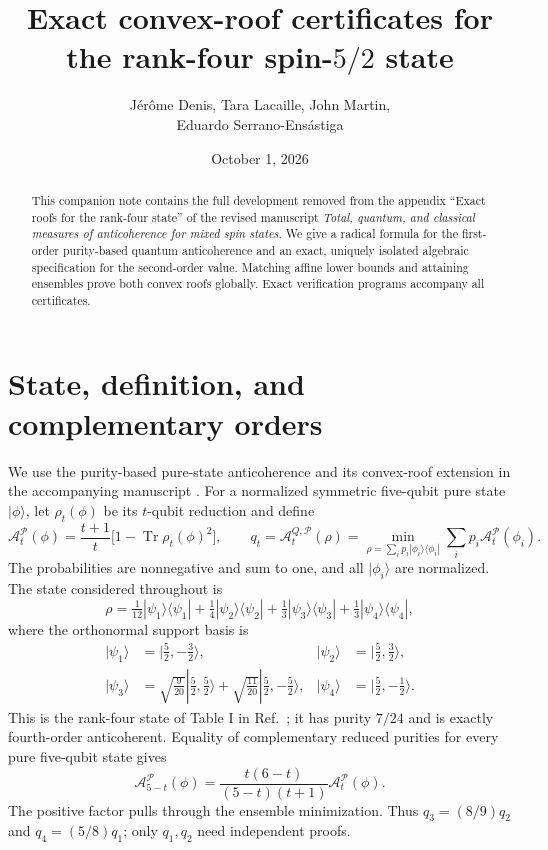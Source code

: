 \documentclass[11pt]{article}
\title{Exact convex-roof certificates for the rank-four spin-$5/2$ state}
\author{J\'er\^ome Denis, Tara Lacaille, John Martin,\\Eduardo Serrano-Ens\'astiga}
\date{October 1, 2026}
\DeclareMathOperator{\Tr}{Tr}
\newcommand{\A}{\mathcal A}
\begin{document}
\maketitle
\begin{abstract}
This companion note contains the full development removed from the appendix ``Exact roofs for the rank-four state'' of the revised manuscript \emph{Total, quantum, and classical measures of anticoherence for mixed spin states}. We give a radical formula for the first-order purity-based quantum anticoherence and an exact, uniquely isolated algebraic specification for the second-order value. Matching affine lower bounds and attaining ensembles prove both convex roofs globally. Exact verification programs accompany all certificates.
\end{abstract}

\section{State, definition, and complementary orders}\label{sec:definition}
We use the purity-based pure-state anticoherence \cite{BaguetteMartin2017} and its convex-roof extension in the accompanying manuscript \cite{Denis2026}. For a normalized symmetric five-qubit pure state $|\phi\rangle$, let $\rho_t(\phi)$ be its $t$-qubit reduction and define
\begin{equation}
 \A_t^{\mathcal P}(\phi)=\frac{t+1}{t}\bigl[1-\Tr\rho_t(\phi)^2\bigr],\qquad
 q_t=\A_t^{Q,\mathcal P}(\rho)=\min_{\rho=\sum_i p_i|\phi_i\rangle\langle\phi_i|}\sum_i p_i\A_t^{\mathcal P}(\phi_i).
\end{equation}
The probabilities are nonnegative and sum to one, and all $|\phi_i\rangle$ are normalized. The state considered throughout is
\begin{equation}\label{eq:j5o2_4AC}
 \rho=\tfrac1{12}|\psi_1\rangle\langle\psi_1|+\tfrac14|\psi_2\rangle\langle\psi_2|
 +\tfrac13|\psi_3\rangle\langle\psi_3|+\tfrac13|\psi_4\rangle\langle\psi_4|,
\end{equation}
where the orthonormal support basis is
\begin{align}
 |\psi_1\rangle&=|\tfrac52,-\tfrac32\rangle,&
 |\psi_2\rangle&=|\tfrac52,\tfrac32\rangle,\nonumber\\
 |\psi_3\rangle&=\sqrt{\tfrac9{20}}|\tfrac52,\tfrac52\rangle+\sqrt{\tfrac{11}{20}}|\tfrac52,-\tfrac52\rangle,&
 |\psi_4\rangle&=|\tfrac52,-\tfrac12\rangle.
\end{align}
This is the rank-four state of Table I in Ref.~\cite{Denis2026}; it has purity $7/24$ and is exactly fourth-order anticoherent. Equality of complementary reduced purities for every pure five-qubit state gives
\begin{equation}
 \A_{5-t}^{\mathcal P}(\phi)=\frac{t(6-t)}{(5-t)(t+1)}\A_t^{\mathcal P}(\phi).
\end{equation}
The positive factor pulls through the ensemble minimization. Thus $q_3=(8/9)q_2$ and $q_4=(5/8)q_1$; only $q_1,q_2$ need independent proofs.
\end{document}

